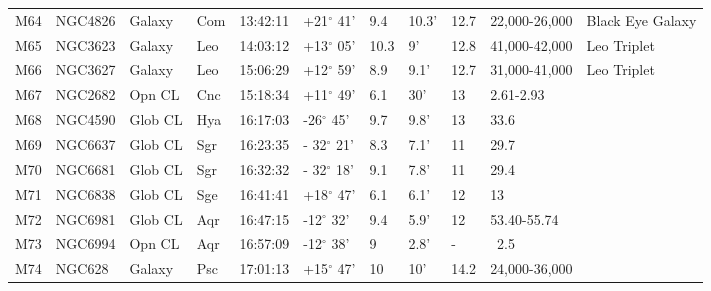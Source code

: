 \begin{longtable}{@{}lllllllllll@{}}
M64        & NGC4826     & Galaxy     & Com       & 13:42:11 & +21$^{\circ}$ 41'  & 9.4       & 10.3'                & 12.7     & 22,000-26,000       & Black Eye Galaxy                          \\
M65        & NGC3623     & Galaxy     & Leo       & 14:03:12 & +13$^{\circ}$ 05'  & 10.3      & 9'                   & 12.8     & 41,000-42,000       & Leo Triplet                               \\
M66        & NGC3627     & Galaxy     & Leo       & 15:06:29 & +12$^{\circ}$ 59'  & 8.9       & 9.1'                 & 12.7     & 31,000-41,000       & Leo Triplet                               \\
M67        & NGC2682     & Opn CL     & Cnc       & 15:18:34 & +11$^{\circ}$ 49'  & 6.1       & 30'                  & 13       & 2.61-2.93           &                                           \\
M68        & NGC4590     & Glob CL    & Hya       & 16:17:03 & -26$^{\circ}$ 45'  & 9.7       & 9.8'                 & 13       & 33.6                &                                           \\
M69        & NGC6637     & Glob CL    & Sgr       & 16:23:35 & - 32$^{\circ}$ 21' & 8.3       & 7.1'                 & 11       & 29.7                &                                           \\
M70        & NGC6681     & Glob CL    & Sgr       & 16:32:32 & - 32$^{\circ}$ 18' & 9.1       & 7.8'                 & 11       & 29.4                &                                           \\
M71        & NGC6838     & Glob CL    & Sge       & 16:41:41 & +18$^{\circ}$ 47'  & 6.1       & 6.1'                 & 12       & 13                  &                                           \\
M72        & NGC6981     & Glob CL    & Aqr       & 16:47:15 & -12$^{\circ}$ 32'  & 9.4       & 5.9'                 & 12       & 53.40-55.74         &                                           \\
M73        & NGC6994     & Opn CL     & Aqr       & 16:57:09 & -12$^{\circ}$ 38'  & 9         & 2.8'                 & -        & ~2.5                &                                           \\
M74        & NGC628      & Galaxy     & Psc       & 17:01:13 & +15$^{\circ}$ 47'  & 10        & 10'                  & 14.2     & 24,000-36,000       &                                           \\

\end{longtable}
